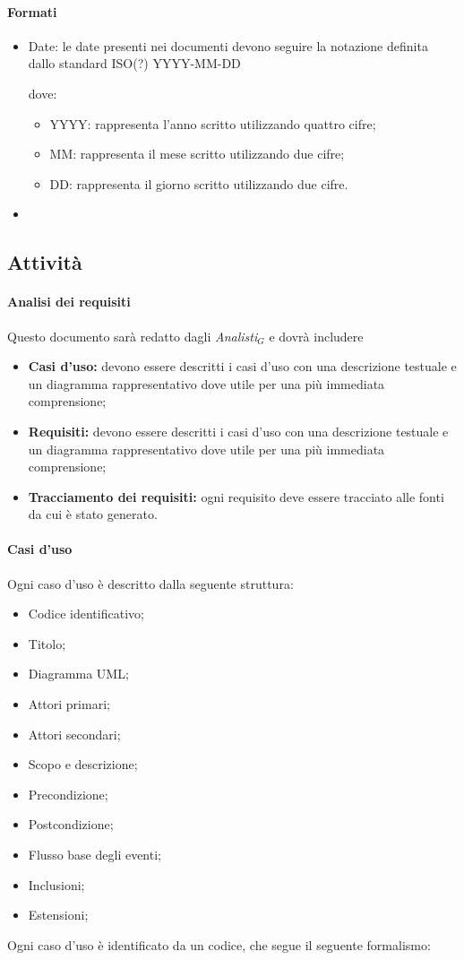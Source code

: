 \paragraph{Formati}
\begin{itemize}
\item  Date: le date presenti nei documenti devono seguire la notazione definita dallo
standard ISO(?) YYYY-MM-DD

dove:
\begin{itemize}
	\item  YYYY: rappresenta l’anno scritto utilizzando quattro cifre;
	\item MM: rappresenta il mese scritto utilizzando due cifre;
	\item DD: rappresenta il giorno scritto utilizzando due cifre.
\end{itemize}
  \item  
\end{itemize}

\subsection{Attività}
\paragraph{Analisi dei requisiti}
Questo documento sarà redatto dagli \textit{Analisti$_{G}$} e dovrà includere
\begin{itemize}
	\item{\textbf{Casi d'uso:}}  devono essere descritti i casi d’uso con una descrizione testuale e
	un diagramma rappresentativo dove utile per una più immediata comprensione;
	\item{\textbf{Requisiti:}}  devono essere descritti i casi d’uso con una descrizione testuale e
	un diagramma rappresentativo dove utile per una più immediata comprensione;
	\item{\textbf{Tracciamento dei requisiti:}}  ogni requisito deve essere tracciato alle fonti da cui è stato generato.
\end{itemize}
\paragraph {Casi d'uso}
Ogni caso d'uso è descritto dalla seguente struttura:
\begin{itemize}
\item Codice identificativo;
\item Titolo;
\item Diagramma UML;
\item Attori primari;
\item Attori secondari;
\item Scopo e descrizione;
\item Precondizione;
\item Postcondizione;
\item Flusso base degli eventi;
\item Inclusioni;
\item Estensioni;
\end{itemize}
Ogni caso d’uso è identificato da un codice, che segue il seguente formalismo: \\

